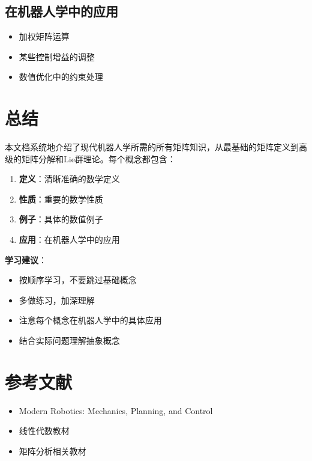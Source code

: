 \documentclass[12pt,a4paper]{article}
\begin{document}
\subsection{在机器人学中的应用}

\begin{itemize}
\item 加权矩阵运算
\item 某些控制增益的调整
\item 数值优化中的约束处理
\end{itemize}

\section{总结}

本文档系统地介绍了现代机器人学所需的所有矩阵知识，从最基础的矩阵定义到高级的矩阵分解和Lie群理论。每个概念都包含：

\begin{enumerate}
\item \textbf{定义}：清晰准确的数学定义
\item \textbf{性质}：重要的数学性质
\item \textbf{例子}：具体的数值例子
\item \textbf{应用}：在机器人学中的应用
\end{enumerate}

\textbf{学习建议}：
\begin{itemize}
\item 按顺序学习，不要跳过基础概念
\item 多做练习，加深理解
\item 注意每个概念在机器人学中的具体应用
\item 结合实际问题理解抽象概念
\end{itemize}

\section{参考文献}

\begin{itemize}
\item Modern Robotics: Mechanics, Planning, and Control
\item 线性代数教材
\item 矩阵分析相关教材
\end{itemize}
\end{document}
